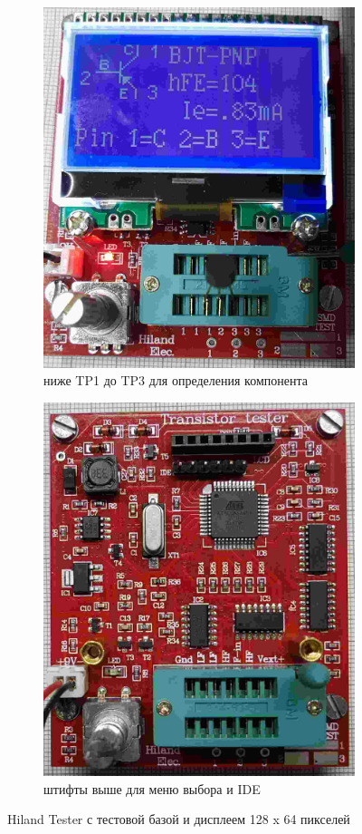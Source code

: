 \begin{figure}[H]
  \begin{subfigure}[b]{.47\textwidth}
    \centering
    \includegraphics[width=.875\textwidth]{../PNG/Hi_u.jpg}
    \caption{ниже TP1 до TP3 для определения компонента}
  \end{subfigure}
  \begin{subfigure}[b]{.5\textwidth}
    \centering
    \includegraphics[width=.756\textwidth]{../PNG/Hi_o.jpg}
    \caption{штифты выше для меню выбора и IDE}
  \end{subfigure}
  \caption{Hiland Tester с тестовой базой и дисплеем 128 x 64 пикселей}
  \label{fig:Hiland}
\end{figure}

